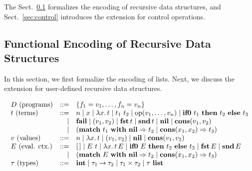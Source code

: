 The Sect.~\ref{sec:recdata} formalizes the encoding of recursive data
structures, and Sect.~\ref{sec:control} introduces the extension for
control operations.

\subsection{Functional Encoding of Recursive Data Structures}
\label{sec:recdata}

In this section, we first formalize the encoding of lists. Next, we discuss the
extension for user-defined recursive data structures.

\[
\begin{array}{lrl}
D\text{ (programs)} &::=& \{f_1 = v_1, \dots, f_n = v_n\} \\
t\text{ (terms)}
  &::=& n \mid x \mid \lambda{x}.\,{t} \mid t_1\ t_2 \mid \mathrm{op}({v_1,\dots,v_n}) \mid \mathbf{if0}~{t_1}~\mathbf{then}~{t_2}~\mathbf{else}~{t_3} \\
 &\mid& \mathbf{fail} \mid ({v_1},{v_2}) \mid {\mathbf{fst}}\,{t} \mid {\mathbf{snd}}\,{t} \mid \mathbf{nil} \mid \mathbf{cons}({v_1},{v_2}) \\
 &\mid& (\mathbf{match}\ {t_1}\ \mathbf{with}\ \mathbf{nil} \Rightarrow {t_2} \mid \mathbf{cons}({x_1},{x_2}) \Rightarrow {t_3}) \\

v\text{ (values)}
  &::=& n \mid \lambda{x}.\,{t} \mid ({v_1},{v_2}) \mid \mathbf{nil} \mid \mathbf{cons}({v_1},{v_2}) \\

E\text{ (eval. ctx.)}
  &::=& [\,] \mid E\ t \mid {\lambda{x}.\,{t}}\,{E} \mid \mathbf{if0}~{E}~\mathbf{then}~{t_2}~\mathbf{else}~{t_3} \mid {\mathbf{fst}}\,{E} \mid {\mathbf{snd}}\,{E} \\
 &\mid& (\mathbf{match}\ {E}\ \mathbf{with}\ \mathbf{nil} \Rightarrow {t_2} \mid \mathbf{cons}({x_1},{x_2}) \Rightarrow {t_3}) \\

\tau\text{ (types)} &::=& \mathbf{int} \mid {\tau_1}\mathbin{\rightarrow}{\tau_2} \mid {\tau_1}\mathbin{\times}{\tau_2} \mid {\tau}\ \mathbf{list} \\
\end{array}
\]

